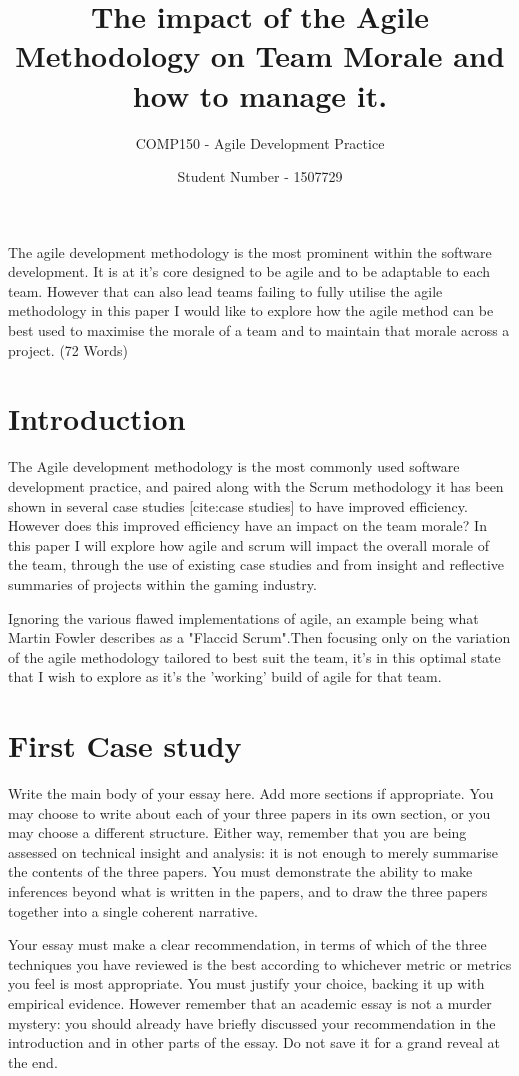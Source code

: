 \documentclass{scrartcl}
\title{The impact of the Agile Methodology on Team Morale and how to manage it.}
\subtitle{COMP150 - Agile Development Practice}
\author{Student Number - 1507729}
\begin{document}
\maketitle

\abstract The agile development methodology is the most prominent within the software development. It is at it's core designed to be agile and to be adaptable to each team. However that can also lead teams failing to fully utilise the agile methodology  in this paper I would like to explore how the agile method can be best used to maximise the morale of a team and to maintain that morale across a project. (72 Words)

\section{Introduction}

The Agile development methodology is the most commonly used software development practice, and paired along with the Scrum methodology it has been shown in several case studies [cite:case studies] to have improved efficiency. However does this improved efficiency have an impact on the team morale? In this paper I will explore how agile and scrum will impact the overall morale of the team, through the use of existing case studies and from insight and reflective summaries of projects within the gaming industry.

Ignoring the various flawed implementations of agile, an example being what Martin Fowler describes as a "Flaccid Scrum".Then focusing only on the variation of the agile methodology tailored to best suit the team, it's in this optimal state that I wish to explore as it's the 'working' build of agile for that team.

\section{First Case study}

Write the main body of your essay here. Add more sections if appropriate. You may choose to write about each of your three papers in its own section, or you may choose a different structure. Either way, remember that you are being assessed on technical insight and analysis: it is not enough to merely summarise the contents of the three papers. You must demonstrate the ability to make inferences beyond what is written in the papers, and to draw the three papers together into a single coherent narrative.

Your essay must make a clear recommendation, in terms of which of the three techniques you have reviewed is the best according to whichever metric or metrics you feel is most appropriate. You must justify your choice, backing it up with empirical evidence. However remember that an academic essay is not a murder mystery: you should already have briefly discussed your recommendation in the introduction and in other parts of the essay. Do not save it for a grand reveal at the end.
\end{document}
